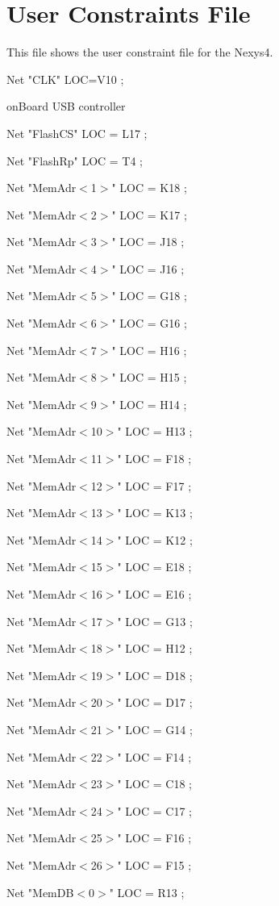 \chapter{User Constraints File}\label{ch:ucffile}

This file shows the user constraint file for the Nexys4.

Net "CLK" LOC=V10 ;

 onBoard USB controller

Net "FlashCS" 
LOC = L17 ; 

Net "FlashRp" 
LOC = T4 ; 


Net "MemAdr$<$1$>$" 
LOC = K18  ;

Net "MemAdr$<$2$>$" 
LOC = K17  ;

Net "MemAdr$<$3$>$" 
LOC = J18  ; 

Net "MemAdr$<$4$>$" 
LOC = J16  ; 

Net "MemAdr$<$5$>$" 
LOC = G18  ; 

Net "MemAdr$<$6$>$" 
LOC = G16  ; 

Net "MemAdr$<$7$>$" 
LOC = H16  ; 

Net "MemAdr$<$8$>$" 
LOC = H15  ; 

Net "MemAdr$<$9$>$" 
LOC = H14  ; 

Net "MemAdr$<$10$>$" 
LOC = H13 ; 

Net "MemAdr$<$11$>$" 
LOC = F18 ; 

Net "MemAdr$<$12$>$" 
LOC = F17 ; 

Net "MemAdr$<$13$>$" 
LOC = K13 ; 

Net "MemAdr$<$14$>$" 
LOC = K12 ; 

Net "MemAdr$<$15$>$" 
LOC = E18 ; 

Net "MemAdr$<$16$>$" 
LOC = E16 ; 

Net "MemAdr$<$17$>$" 
LOC = G13 ; 

Net "MemAdr$<$18$>$" 
LOC = H12 ; 

Net "MemAdr$<$19$>$" 
LOC = D18 ; 

Net "MemAdr$<$20$>$" 
LOC = D17 ; 

Net "MemAdr$<$21$>$" 
LOC = G14 ; 

Net "MemAdr$<$22$>$" 
LOC = F14 ; 

Net "MemAdr$<$23$>$" 
LOC = C18 ; 

Net "MemAdr$<$24$>$" 
LOC = C17 ; 

Net "MemAdr$<$25$>$" 
LOC = F16 ; 

Net "MemAdr$<$26$>$" 
LOC = F15 ; 


Net "MemDB$<$0$>$" 
LOC = R13 ; 

